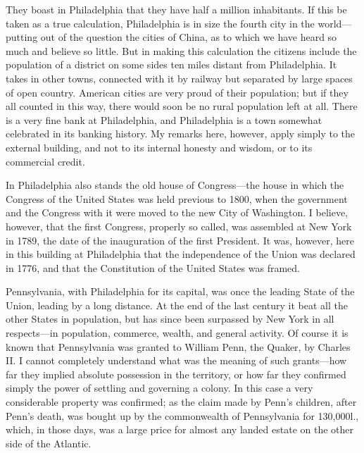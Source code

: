 They boast in Philadelphia that they have half a million
inhabitants.  If this be taken as a true calculation, Philadelphia
is in size the fourth city in the world---putting out of the
question the cities of China, as to which we have heard so much and
believe so little.  But in making this calculation the citizens
include the population of a district on some sides ten miles
distant from Philadelphia.  It takes in other towns, connected with
it by railway but separated by large spaces of open country.
American cities are very proud of their population; but if they all
counted in this way, there would soon be no rural population left
at all.  There is a very fine bank at Philadelphia, and
Philadelphia is a town somewhat celebrated in its banking history.
My remarks here, however, apply simply to the external building,
and not to its internal honesty and wisdom, or to its commercial
credit.

In Philadelphia also stands the old house of Congress---the house in
which the Congress of the United States was held previous to 1800,
when the government and the Congress with it were moved to the new
City of Washington.  I believe, however, that the first Congress,
properly so called, was assembled at New York in 1789, the date of
the inauguration of the first President.  It was, however, here in
this building at Philadelphia that the independence of the Union
was declared in 1776, and that the Constitution of the United
States was framed.

Pennsylvania, with Philadelphia for its capital, was once the
leading State of the Union, leading by a long distance.  At the end
of the last century it beat all the other States in population, but
has since been surpassed by New York in all respects---in
population, commerce, wealth, and general activity.  Of course it
is known that Pennsylvania was granted to William Penn, the Quaker,
by Charles II.  I cannot completely understand what was the meaning
of such grants---how far they implied absolute possession in the
territory, or how far they confirmed simply the power of settling
and governing a colony.  In this case a very considerable property
was confirmed; as the claim made by Penn's children, after Penn's
death, was bought up by the commonwealth of Pennsylvania for
130,000l., which, in those days, was a large price for almost any
landed estate on the other side of the Atlantic.

